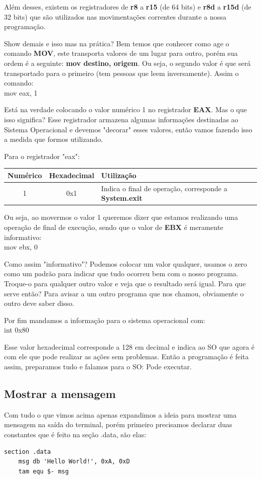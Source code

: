 Além desses, existem os registradores de \textbf{r8} a \textbf{r15} (de 64 bits) e \textbf{r8d} a \textbf{r15d} (de 32 bits) que são utilizados nas movimentações correntes durante a nossa programação.

Show demais e isso mas na prática? Bem temos que conhecer como age o comando \textbf{MOV}, este transporta valores de um lugar para outro, porém sua ordem é a seguinte: \textbf{mov destino, origem}. Ou seja, o segundo valor é que será transportado para o primeiro (tem pessoas que leem inversamente). Assim o comando: \\
{\ttfamily mov eax, 1}

Está na verdade colocando o valor numérico 1 no registrador \textbf{EAX}. Mas o que isso significa? Esse registrador armazena algumas informações destinadas ao Sistema Operacional e devemos "decorar" esses valores, então vamos fazendo isso a medida que formos utilizando.

Para o registrador "eax":
\begin{table}[H]
	\centering 
	\begin{tabular}{c | c | l }
		\textbf{Numérico} & \textbf{Hexadecimal} & \textbf{Utilização} \\ \hline
		1 & 0x1 & Indica o final de operação, corresponde a \textbf{System.exit}
	\end{tabular}
\end{table}

Ou seja, ao movermos o valor 1 queremos dizer que estamos realizando uma operação de final de execução, sendo que o valor de \textbf{EBX} é meramente informativo: \\
{\ttfamily mov ebx, 0}

Como assim "informativo"? Podemos colocar um valor qualquer, usamos o zero como um padrão para indicar que tudo ocorreu bem com o nosso programa. Troque-o para qualquer outro valor e veja que o resultado será igual. Para que serve então? Para avisar a um outro programa que nos chamou, obviamente o outro deve saber disso.

Por fim mandamos a informação para o sistema operacional com: \\
{\ttfamily int 0x80}

Esse valor hexadecimal corresponde a 128 em decimal e indica ao SO que agora é com ele que pode realizar as ações sem problemas. Então a programação é feita assim, preparamos tudo e falamos para o SO: Pode executar.

\subsection{Mostrar a mensagem}
Com tudo o que vimos acima apenas expandimos a ideia para mostrar uma mensagem na saída do terminal, porém primeiro precisamos declarar duas constantes que é feito na seção .data, são elas: \\
\begin{lstlisting}[]
section .data
	msg db 'Hello World!', 0xA, 0xD
	tam equ $- msg
\end{lstlisting}

